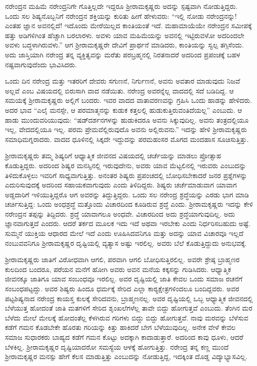 ನರೇಂದ್ರನ ಮಹಿಮೆ ನರೇಂದ್ರನಿಗೇ ಗೊತ್ತಿಲ್ಲದೇ ಇದ್ದರೂ ಶ‍್ರೀರಾಮಕೃಷ್ಣರು ಅದನ್ನು ಸ್ಪಷ್ಟವಾಗಿ ನೋಡುತ್ತಿದ್ದರು. ಒಂದು ಸಲ ಶಿಷ್ಯನೊಬ್ಬನಿಗೆ ನರೇಂದ್ರನ ಶಕ್ತಿಯನ್ನು ಕುರಿತು ಹೀಗೆ ಹೇಳುವರು: “ಇಲ್ಲಿ ನೋಡು ನರೇಂದ್ರನನ್ನು! ಎಂತಹ ಜ್ಞಾನ ಅವನಲ್ಲಿದೆ! ಇದೊಂದು ಮೇರೆಯಿಲ್ಲದ ಕಾಂತಿಯಂತೆ ಇದೆ. ಮಹಾಮಾಯೆಯೇ ನರೇಂದ್ರನ ಸಮೀಪಕ್ಕೆ ಹತ್ತು ಅಡಿಗಳಿಗಿಂತ ಹೆಚ್ಚಾಗಿ ಬರಲಾರಳು. ಅವಳು ಯಾವ ಮಹಿಮೆಯನ್ನು ಅವನಲ್ಲಿ ಇಟ್ಟಿರುವಳೋ ಅದರಿಂದಲೇ ಅವಳು ಬದ್ಧಳಾಗಿರುವಳು.” ಆಗ ಶ‍್ರೀರಾಮಕೃಷ್ಣರೇ ದೇವಿಗೆ ಪ್ರಾರ್ಥನೆ ಮಾಡಿದರು, ಕಾಂತಿಯನ್ನು ಸ್ವಲ್ಪ ತಗ್ಗಿಸೆಂದು. ಅದು ಜಾಸ್ತಿಯಾಗಿ ನರೇಂದ್ರ ತನ್ನ ವ್ಯಕ್ತಿತ್ವವನ್ನು ಮರೆತು ಪರಬ್ರಹ್ಮನಲ್ಲಿ ನಿರತನಾದರೆ ಅದರಿಂದ ಪ್ರಪಂಚಕ್ಕೆ ಬಹಳ ನಷ್ಟವಾಗುವುದೆಂದು ಭಾವಿಸಿದರು.

ಒಂದು ದಿನ ನರೇಂದ್ರ ಮತ್ತು ಇತರರಿಗೆ ದೇವರು ಸಗುಣನೆ, ನಿರ್ಗುಣನೆ, ಅವನು ಅವತಾರ ಮಾಡುವುದು ನಿಜವೆ ಅಲ್ಲವೆ ಎಂಬ ವಿಷಯದಲ್ಲಿ ಬಿರುಸಾಗಿ ವಾದ ನಡೆಯಿತು. ನರೇಂದ್ರ ಅವರನ್ನೆಲ್ಲ ವಾದದಲ್ಲಿ ಸದೆ ಬಡಿದಿದ್ದ. ಆ ಸಮಯಕ್ಕೆ ಶ‍್ರೀರಾಮಕೃಷ್ಣರು ಅಲ್ಲಿಗೆ ಬಂದರು. ಇವರ ವಾದದ ವಾತಾವರಣವನ್ನು ಗ್ರಹಿಸಿ ಒಂದು ಹಾಡನ್ನು ಹೇಳಿದರು. ಅದರ ಭಾವ “ಎಲೈ ಮನಸ್ಸೇ, ಆ ಪರಮಾತ್ಮನನ್ನು ಕುಡುಕ ಕತ್ತಲಲ್ಲಿ ಹುಡುಕುತ್ತಿರುವಂತಿದೆಯಲ್ಲ” ಎಂಬುದು. ಆ ಹಾಡು ಮುಂದುವರಿಯುವುದು: “ಷಡ್‍ದರ್ಶನಗಳನ್ನು ಹುಡುಕಿದರೂ ಅವನು ಸಿಕ್ಕುವುದಿಲ್ಲ. ಅವನು ತಂತ್ರದಲ್ಲಿಯೂ ಇಲ್ಲ, ವೇದದಲ್ಲಿಯೂ ಇಲ್ಲ. ಪರಮ ಪ್ರೇಮವೆಲ್ಲಿರುವುದೊ ಅವನು ಅಲ್ಲಿರುವನು.” ಇದನ್ನು ಹೇಳಿ ಶ‍್ರೀರಾಮಕೃಷ್ಣರು ಸಮಾಧಿಮಗ್ನರಾದರು. ವಾದದ ಧೂಳಿನಲ್ಲಿ ಸಿಕ್ಕದೇ ಇದ್ದುದನ್ನು ಪರಮಹಂಸರ ಮೊಗದ ಮಂದಹಾಸ ಸೂಚಿಸುತ್ತಿತ್ತು.

ಶ‍್ರೀರಾಮಕೃಷ್ಣರು ತಮ್ಮ ಶಿಷ್ಯರಿಗೆ ಆಧ್ಯಾತ್ಮಿಕ ಜೀವನದ ವಿಷಯದಲ್ಲಿ ಚರ್ಚೆಯನ್ನು ಮಾಡಲು ಪ್ರೋತ್ಸಾಹ ಕೊಡುತ್ತಿದ್ದರು. ಅದರಿಂದ ಶಿಷ್ಯರ ಮನಸ್ಸಿನಲ್ಲಿ ಇರುವುದೇನು, ಅವರು ಯಾವ ಮೆಟ್ಟಲಿನಲ್ಲಿ ಇರುವರು ಎಂಬುದನ್ನು ತಿಳಿದುಕೊಳ್ಳಲು ಇವರಿಗೆ ಸಾಧ್ಯವಾಗುತ್ತಿತ್ತು. ಅನಂತರ ಶಿಷ್ಯರು ಪ್ರಪಂಚದಲ್ಲಿ ಬೋಧಿಸಬೇಕಾದರೆ ಜನರ ಪ್ರಶ್ನೆಗಳನ್ನು ಎದುರಿಸುವುದಕ್ಕೆ ಅದರಿಂದ ಸಹಾಯಕವಾಗುವುದು ಎಂದು ತಿಳಿದಿದ್ದರು. ಶಿಷ್ಯರು ಚರ್ಚೆಮಾಡುವಾಗ ಯಾವಾಗ ಅಡ್ಡದಾರಿಗೆ ಇಳಿಯುತ್ತಿದ್ದರೊ ಆಗ ಅವರನ್ನು ತಿದ್ದುತ್ತಿದ್ದರು. ಒಂದು ಸಲ ನರೇಂದ್ರ ಶ್ರದ್ಧೆಯನ್ನು ಎರಡು ಭಾಗ ಮಾಡಿ ಚರ್ಚಿಸುತ್ತಿದ್ದ: ಒಂದು ಅಂಧಶ್ರದ್ಧೆ ಮತ್ತೊಂದು ವಿಚಾರದಿಂದ ಕೂಡಿರುವ ಶ್ರದ್ಧೆ ಎಂದು. ಶ‍್ರೀರಾಮಕೃಷ್ಣರು ಇದನ್ನು ಕೇಳಿ ನರೇಂದ್ರನ ತಪ್ಪನ್ನು ತಿದ್ದಿದರು. ಶ್ರದ್ಧೆ ಯಾವಾಗಲೂ ಅಂಧವೇ. ವಿಚಾರದಿಂದ ಅದು ಶ್ರದ್ಧೆಯಾಗುವುದಿಲ್ಲ. ಅದು ಜ್ಞಾನವಾಗುತ್ತದೆ ಎಂದರು. ಆದರೆ ತರ್ಕದ ಮೂಲಕ ಇದು ಇದೆ ಅಥವಾ ಇರಬೇಕು ಎಂದು ನಿರ್ಧರಿಸಬಹುದು ಅಷ್ಟೆ. ಸುಮ್ಮನೆ ಯುಕ್ತಿಯ ಆಧಾರದ ಮೇಲೆ ಇದೆ ಎಂದು ಊಹಿಸಿದವನಿಗೂ ಮತ್ತು ಅದನ್ನು ಯಾವ ವಿಚಾರವೂ ಇಲ್ಲದೆ ನಂಬುವವನಿಗೂ ಶ‍್ರೀರಾಮಕೃಷ್ಣರ ದೃಷ್ಟಿಯಲ್ಲಿ ವ್ಯತ್ಯಾಸ ಅಷ್ಟು ಇರಲಿಲ್ಲ. ಅವರು ಬೆಲೆ ಕೊಡುತ್ತಿದ್ದುದು ಅನುಭವಕ್ಕೆ.

ಶ‍್ರೀರಾಮಕೃಷ್ಣರು ಜಾತಿಗೆ ವಿರೋಧವಾಗಿ ಆಗಲಿ, ಪರವಾಗಿ ಆಗಲಿ ಬೋಧಿಸುತ್ತಿರಲಿಲ್ಲ. ಅವರೇ ಶ್ರೇಷ್ಠ ಬ್ರಾಹ್ಮಣರ ಕುಲದಿಂದ ಬಂದರೂ, ಪರೆಯನ ಮನೆಗೆ ಹೋಗಿ ಅವರು ಅವನ ಮನೆಯ ಕಕ್ಕಸನ್ನು ಗುಡಿಸಿದರು. ಆಧ್ಯಾತ್ಮಿಕ ಜೀವನಕ್ಕೂ ಜಾತಿಗೂ ಯಾವ ಸಂಬಂಧವೂ ಇರಲಿಲ್ಲ. ಅವರ ದೃಷ್ಟಿಯಲ್ಲಿ ಜಾತಿ ಕೇವಲ ಒಂದು ಸಮಾಜ ರಚನೆಗೆ ಸಂಬಂಧಪಟ್ಟದ್ದು. ಅವರ ಶಿಷ್ಯರು ಹಿಂದೂ ಧರ್ಮಕ್ಕೆ ಸೇರಿದ ಎಲ್ಲಾ ಕಾರ‍್ಯಕ್ಷೇತ್ರಗಳಿಂದಲೂ ಬಂದಿದ್ದವರು. ಅವರ ಪಟ್ಟಶಿಷ್ಯನಾದ ನರೇಂದ್ರ ಕಾಯಸ್ತ ಕುಲಕ್ಕೆ ಸೇರಿದವನು, ಬ್ರಾಹ್ಮಣನಲ್ಲ. ಅವರ ದೃಷ್ಟಿಯಲ್ಲಿ ಒಬ್ಬ ಆಧ್ಯಾತ್ಮಿಕ ಜೀವನದಲ್ಲಿ ಬೆಳೆಯುತ್ತ ಹೋದಂತೆ ಜಾತಿ ಮತಗಳಿಗೆ ಸೇರಿದ ಶೃಂಖಲೆಗಳೆಲ್ಲ ತಾವೇ ಬಿದ್ದು ಹೋಗುತ್ತವೆ ಎಂಬುದು. ತೆಂಗಿನ ಮರ ಬೆಳೆದು ಮೇಲೆ ಮೇಲಕ್ಕೆ ಹೋದಂತೆಲ್ಲ ಕೆಳಗಿರುವ ಗರಿಗಳು ಬಿದ್ದು ಬಿದ್ದು ಹೋಗುತ್ತವೆ. ನಾವು ಮರವನ್ನು ಬೆಳೆಸುವ ಕಡೆಗೆ ಗಮನ ಕೊಡಬೇಕೇ ಹೊರತು ಗರಿಯನ್ನು ಕಿತ್ತು ಹಾಕಿದರೆ ಬೇಗ ಬೆಳೆಯುವುದಿಲ್ಲ. ಅನೇಕ ವೇಳೆ ಕೇವಲ ಸಮಾಜ ಸುಧಾರಕರು ಬಾಹ್ಯದ ಕಡೆಗೆ ಗಮನ ಕೊಟ್ಟು ಅದಕ್ಕಾಗಿ ಕಾದಾಡುತ್ತಾರೆ. ಅದರಿಂದ ಕಾವು ಧೂಳು, ಆದರೆ ಬೆಳಕಿಲ್ಲ. ಶ‍್ರೀರಾಮಕೃಷ್ಣರ ದೃಷ್ಟಿಯಾದರೋ ಸಮಸ್ಯೆಯ ಆಳಕ್ಕೆ ಹೋಗುತ್ತಿತ್ತು. ನರೇಂದ್ರ ತನ್ನ ಕಣ್ಣ ಮುಂದೆ ಶ‍್ರೀರಾಮಕೃಷ್ಣರ ಮನಸ್ಸು ಹೇಗೆ ಕೆಲಸ ಮಾಡುತ್ತಿತ್ತು ಎಂಬುದನ್ನು ನೋಡುತ್ತಿದ್ದ, ಇದಕ್ಕಿಂತ ದೊಡ್ಡ ವಿದ್ಯಾಭ್ಯಾಸವಿಲ್ಲ.

